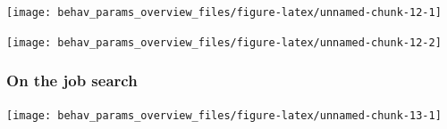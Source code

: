 \documentclass[
]{article}
\begin{document}
\begin{center}\texttt{[image: behav\_params\_overview\_files/figure-latex/unnamed-chunk-12-1]} \end{center}

\begin{center}\texttt{[image: behav\_params\_overview\_files/figure-latex/unnamed-chunk-12-2]} \end{center}

\subsubsection{On the job search}\label{on-the-job-search}

\begin{center}\texttt{[image: behav\_params\_overview\_files/figure-latex/unnamed-chunk-13-1]} \end{center}
\end{document}
